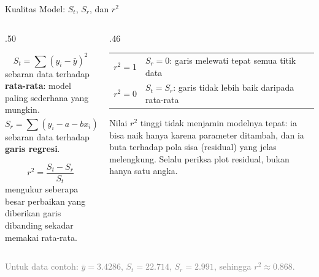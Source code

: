\documentclass[aspectratio=169,10pt]{beamer}
\newcommand{\smallgray}[1]{\textcolor{GrayText}{\scriptsize #1}}
\begin{document}
\begin{frame}{Kualitas Model: $S_t$, $S_r$, dan $r^2$}
\scriptsize
\begin{columns}[T,totalwidth=\textwidth]
\begin{column}{.50\textwidth}
\begin{bluebox}
\[
S_t=\sum(y_i-\bar{y})^2
\]
sebaran data terhadap \textbf{rata-rata}: model paling sederhana yang mungkin.
\[
S_r=\sum(y_i-a-bx_i)^2
\]
sebaran data terhadap \textbf{garis regresi}.
\end{bluebox}
\begin{orangebox}
\[
r^2=\frac{S_t-S_r}{S_t}
\]
mengukur seberapa besar perbaikan yang diberikan garis dibanding sekadar memakai rata-rata.
\end{orangebox}
\end{column}
\begin{column}{.46\textwidth}
\begin{greenbox}
\begin{tabularx}{\linewidth}{>{\bfseries}p{.20\linewidth} X}
\toprule
$r^2=1$ & $S_r=0$: garis melewati tepat semua titik data\\
$r^2=0$ & $S_t=S_r$: garis tidak lebih baik daripada rata-rata\\
\bottomrule
\end{tabularx}
\end{greenbox}
\begin{goldbox}
Nilai $r^2$ tinggi tidak menjamin modelnya tepat: ia bisa naik hanya karena parameter ditambah, dan ia buta terhadap pola sisa (residual) yang jelas melengkung. Selalu periksa plot residual, bukan hanya satu angka.
\end{goldbox}
\end{column}
\end{columns}
\vfill
\smallgray{Untuk data contoh: $\bar{y}=3.4286$, $S_t=22.714$, $S_r=2.991$, sehingga $r^2\approx0.868$.}
\end{frame}
\end{document}
